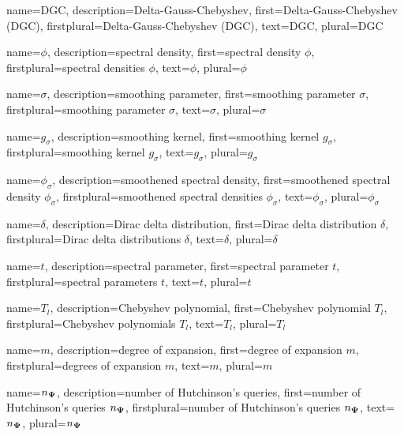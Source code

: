 {%
  name={DGC},%
  description={Delta-Gauss-Chebyshev},%
  first={Delta-Gauss-Chebyshev (DGC)},%
  firstplural={Delta-Gauss-Chebyshev (DGC)},%
  text={DGC},%
  plural={DGC}%
}

{%
  name={$\phi$},%
  description={spectral density},%
  first={spectral density $\phi$},%
  firstplural={spectral densities $\phi$},%
  text={$\phi$},%
  plural={$\phi$}%
}

{%
  name={$\sigma$},%
  description={smoothing parameter},%
  first={smoothing parameter $\sigma$},%
  firstplural={smoothing parameter $\sigma$},%
  text={$\sigma$},%
  plural={$\sigma$}%
}

{%
  name={$g_{\sigma}$},%
  description={smoothing kernel},%
  first={smoothing kernel $g_{\sigma}$},%
  firstplural={smoothing kernel $g_{\sigma}$},%
  text={$g_{\sigma}$},%
  plural={$g_{\sigma}$}%
}

{%
  name={$\phi_{\sigma}$},%
  description={smoothened spectral density},%
  first={smoothened spectral density $\phi_{\sigma}$},%
  firstplural={smoothened spectral densities $\phi_{\sigma}$},%
  text={$\phi_{\sigma}$},%
  plural={$\phi_{\sigma}$}%
}

{%
  name={$\delta$},%
  description={Dirac delta distribution},%
  first={Dirac delta distribution $\delta$},%
  firstplural={Dirac delta distributions $\delta$},%
  text={$\delta$},%
  plural={$\delta$}%
}

{%
  name={$t$},%
  description={spectral parameter},%
  first={spectral parameter $t$},%
  firstplural={spectral parameters $t$},%
  text={$t$},%
  plural={$t$}%
}

{%
  name={$T_l$},%
  description={Chebyshev polynomial},%
  first={Chebyshev polynomial $T_l$},%
  firstplural={Chebyshev polynomials $T_l$},%
  text={$T_l$},%
  plural={$T_l$}%
}

{%
  name={$m$},%
  description={degree of expansion},%
  first={degree of expansion $m$},%
  firstplural={degrees of expansion $m$},%
  text={$m$},%
  plural={$m$}%
}

{%
  name={$n_{\boldsymbol{\Psi}}$},%
  description={number of Hutchinson's queries},%
  first={number of Hutchinson's queries $n_{\boldsymbol{\Psi}}$},%
  firstplural={number of Hutchinson's queries $n_{\boldsymbol{\Psi}}$},%
  text={$n_{\boldsymbol{\Psi}}$},%
  plural={$n_{\boldsymbol{\Psi}}$}%
}

